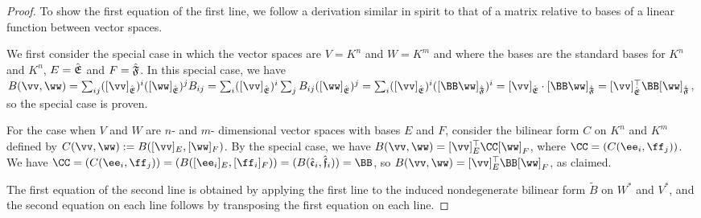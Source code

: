 \begin{proof}
  
    To show the first equation of the first line, we follow a derivation similar in spirit to that of a matrix relative to bases of a linear function between vector spaces. 
    
    We first consider the special case in which the vector spaces are $V = K^n$ and $W = K^m$ and where the bases are the standard bases for $K^n$ and $K^n$, $E = {\hat{\mathfrak{E}}}$ and $F = {\hat{\mathfrak{F}}}$. In this special case, we have $B(\vv, \ww) = \sum_{ij} ([\vv]_\sE)^i ([\ww]_\sE)^j B_{ij} = \sum_i ([\vv]_\sE)^i \sum_j B_{ij} ([\ww]_\sE)^j = \sum_i ([\vv]_\sE)^i ([\BB \ww]_\sF)^i = [\vv]_\sE \cdot [\BB \ww]_\sF = [\vv]_\sE^\top \BB [\ww]_\sF$, so the special case is proven. 
    
    For the case when $V$ and $W$ are $n$- and $m$- dimensional vector spaces with bases $E$ and $F$, consider the bilinear form $C$ on $K^n$ and $K^m$ defined by $C(\vv, \ww) := B([\vv]_E, [\ww]_F)$. By the special case, we have $B(\vv, \ww) = [\vv]_E^\top \CC [\ww]_F$, where $\CC = (C(\ee_i, \ff_j))$. We have $\CC = (C(\ee_i, \ff_j)) = (B([\ee_i]_E, [\ff_i]_F)) = (B(\see_i, \sff_i)) = \BB$, so $B(\vv, \ww) = [\vv]_E^\top \BB [\ww]_F$, as claimed.
    
    The first equation of the second line is obtained by applying the first line to the induced nondegenerate bilinear form $\widetilde{B}$ on $W^*$ and $V^*$, and the second equation on each line follows by transposing the first equation on each line.
\end{proof}
 
